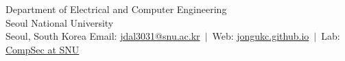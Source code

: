 \documentclass[10pt]{article}
\begin{document}
  {Department of Electrical and Computer Engineering\\
   Seoul National University\\
   Seoul, South Korea}
  {Email: \href{mailto:jdal3031@snu.ac.kr}{jdal3031@snu.ac.kr} \,$|$\,
   Web: \href{https://jongukc.github.io}{jongukc.github.io} \,$|$\,
   Lab: \href{https://compsec.snu.ac.kr}{CompSec at SNU}}







\end{document}
